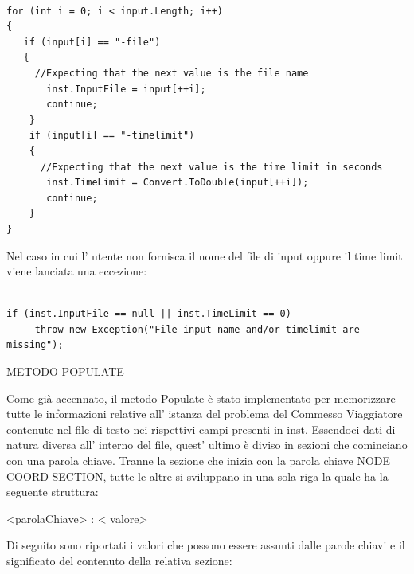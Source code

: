\documentclass[11pt]{article}
\begin{document}
\begin{lstlisting}

for (int i = 0; i < input.Length; i++)
{
   if (input[i] == "-file")
   {
     //Expecting that the next value is the file name
       inst.InputFile = input[++i];
       continue;
    }
    if (input[i] == "-timelimit")
    {
      //Expecting that the next value is the time limit in seconds
       inst.TimeLimit = Convert.ToDouble(input[++i]);
       continue;
    }
}   			
\end{lstlisting}

Nel caso in cui l' utente non fornisca il nome del file di input oppure il time limit viene lanciata una eccezione:

\begin{lstlisting}

if (inst.InputFile == null || inst.TimeLimit == 0)
     throw new Exception("File input name and/or timelimit are missing");

\end{lstlisting}


\vspace{2\baselineskip}
METODO POPULATE
\vspace{2\baselineskip}

Come gi\`a accennato, il metodo Populate \`e stato implementato per memorizzare tutte le informazioni relative all' istanza del problema del Commesso Viaggiatore contenute nel file di testo nei rispettivi campi presenti in inst.
Essendoci dati di natura diversa all' interno del file, quest' ultimo \`e diviso in sezioni che cominciano con una parola chiave. Tranne la sezione che inizia con la parola chiave NODE COORD SECTION, tutte le altre si sviluppano in una sola riga la quale ha la seguente struttura:

\begin{center}
<parolaChiave> : < valore> 
\end{center}

Di seguito sono riportati i valori che possono essere assunti dalle parole chiavi e il significato del contenuto della relativa sezione: 
\end{document}
